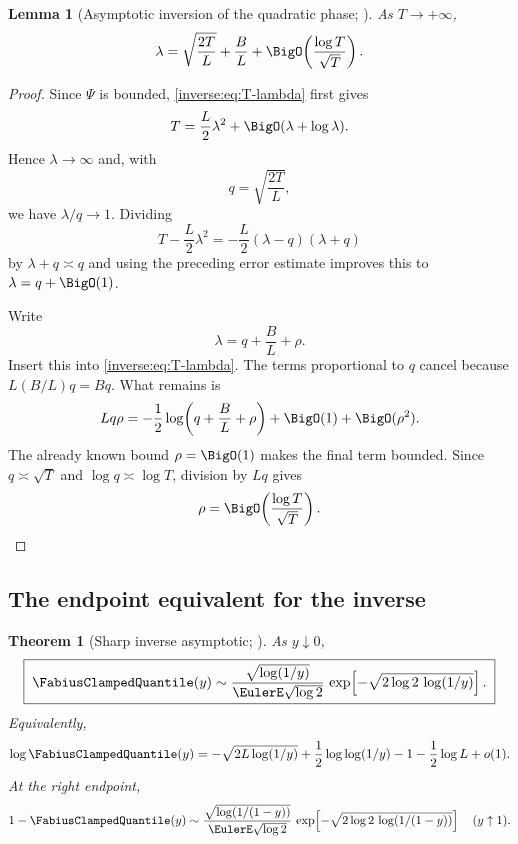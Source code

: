 \documentclass[11pt,oneside]{article}
\newtheorem{theorem}{Theorem}[section]
\newtheorem{lemma}[lemma]{Lemma}
\theoremstyle{definition}
\theoremstyle{remark}
\begin{document}
\begin{lemma}[Asymptotic inversion of the quadratic phase; \Derived]
\label{inverse:lem:lambda-from-T}
As $T\to+\infty$,
\[
 \lambda
 =\sqrt{\frac{2T}{L}}+\frac BL
   +\BigO\!\left(\frac{\log T}{\sqrt T}\right).
\]
\end{lemma}

\begin{proof}
Since $\Psi$ is bounded, \eqref{inverse:eq:T-lambda} first gives
\[
 T=\frac L2\lambda^2+\BigO(\lambda+\log\lambda).
\]
Hence $\lambda\to\infty$ and, with
\[
 q=\sqrt{\frac{2T}{L}},
\]
we have $\lambda/q\to1$.  Dividing
\[
 T-\frac L2\lambda^2
 =-\frac L2(\lambda-q)(\lambda+q)
\]
by $\lambda+q\asymp q$ and using the preceding error estimate improves
this to $\lambda=q+\BigO(1)$.

Write
\[
 \lambda=q+\frac BL+\rho.
\]
Insert this into \eqref{inverse:eq:T-lambda}.  The terms proportional to $q$
cancel because $L(B/L)q=Bq$.  What remains is
\[
 Lq\rho
 =-\frac12\log\!\left(q+\frac BL+\rho\right)+\BigO(1)
   +\BigO(\rho^2).
\]
The already known bound $\rho=\BigO(1)$ makes the final term bounded.
Since $q\asymp\sqrt T$ and $\log q\asymp\log T$, division by $Lq$ gives
\[
 \rho=\BigO\!\left(\frac{\log T}{\sqrt T}\right).
\]
\end{proof}

\subsection{The endpoint equivalent for the inverse}

\begin{theorem}[Sharp inverse asymptotic; \Derived]
\label{inverse:thm:sharp-inverse-asymptotic}
As $y\downarrow0$,
\begin{equation}
 \boxed{\;
 \FabiusClampedQuantile(y)\sim
 \frac{\sqrt{\log(1/y)}}{\EulerE\sqrt{\log2}}\,
 \exp\!\left[-\sqrt{2\log2\,\log(1/y)}\right].
 \;} \label{inverse:eq:sharp-inverse}
\end{equation}
Equivalently,
\begin{equation}
 \log\FabiusClampedQuantile(y)
 =-\sqrt{2L\log(1/y)}
  +\frac12\log\log(1/y)
  -1-\frac12\log L+o(1). \label{inverse:eq:log-sharp-inverse}
\end{equation}
At the right endpoint,
\begin{equation}
 1-\FabiusClampedQuantile(y)\sim
 \frac{\sqrt{\log(1/(1-y))}}{\EulerE\sqrt{\log2}}\,
 \exp\!\left[-\sqrt{2\log2\,\log(1/(1-y))}\right]
 \quad(y\uparrow1). \label{inverse:eq:right-inverse-asymptotic}
\end{equation}
\end{theorem}
\end{document}
